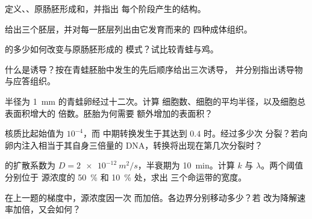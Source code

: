 \begin{exercise}[$\star$]\label{exo:b2:vertebrate-development:1}
定义、、原肠胚形成和，并指出
每个阶段产生的结构。
\end{exercise}

\begin{exercise}[$\star$]\label{exo:b2:vertebrate-development:2}
给出三个胚层，并对每一胚层列出由它发育而来的
四种成体组织。
\end{exercise}

\begin{exercise}[$\star$]\label{exo:b2:vertebrate-development:3}
的多少如何改变与原肠胚形成的
模式？试比较青蛙与鸡。
\end{exercise}

\begin{exercise}[$\star$]\label{exo:b2:vertebrate-development:4}
什么是诱导？按在青蛙胚胎中发生的先后顺序给出三次诱导，
并分别指出诱导物与应答组织。
\end{exercise}

\begin{exercise}[$\star\star$]\label{exo:b2:vertebrate-development:5}
半径为 \qty{1}{mm} 的青蛙卵经过十二次。计算
细胞数、细胞的平均半径，以及细胞总表面积增大的
倍数。胚胎为何需要
额外增加的表面积？
\end{exercise}

\begin{exercise}[$\star\star$]\label{exo:b2:vertebrate-development:6}
核质比起始值为 $10^{-4}$，而
中期转换发生于其达到 $0.4$ 时。经过多少次
分裂？若向卵内注入相当于其自身三倍量的
DNA，转换将出现在第几次分裂时？
\end{exercise}

\begin{exercise}[$\star\star$]\label{exo:b2:vertebrate-development:7}
的扩散系数为 $D = \qty{2e-12}{m^2/s}$，半衰期为
\qty{10}{min}。计算 $k$ 与 $\lambda$。两个阈值分别位于
源浓度的 \qty{50}{\%} 和 \qty{10}{\%} 处，求出
三个命运带的宽度。
\end{exercise}

\begin{exercise}[$\star\star$]\label{exo:b2:vertebrate-development:8}
在上一题的梯度中，源浓度因一次
而加倍。各边界分别移动多少？若
改为降解速率加倍，又会如何？
\end{exercise}

